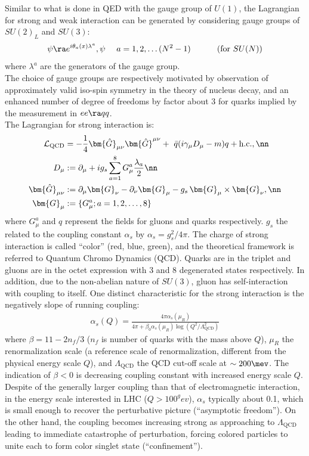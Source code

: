 Similar to what is done in QED with the gauge group of $U(1)$, the Lagrangian for strong and weak interaction can be generated by considering gauge groups of $SU(2)_L$ and $SU(3)$:
$$
\psi \ra e^{i \theta_a(x) \lambda^a}, \psi \,\,\,\,\,\,\,\, a=1,2,\dots (N^2-1) \,\,\,\,\,\, \mbox{\phantom{MM}  (for $SU(N)$)} 
$$
where $\lambda^a$ are the generators of the gauge group. \\
The choice of gauge groups are respectively motivated by observation of approximately valid iso-spin symmetry in the theory of nucleus decay, and an enhanced number of degree of freedoms by factor about 3 for quarks implied by the measurement in $ee\ra qq$. \\

The Lagrangian for strong interaction is:
\begin{align}
\mathcal{L}_{\mathrm{QCD}} & = -\frac{1}{4} \bm{\hat{G}}_{\mu\nu} \bm{\hat{G}}^{\mu\nu} + \,\, \bar{q}(i \gamma_\mu D_\mu - m) q + \mathrm{h.c.}, \nn \\
D_\mu & := \partial_\mu + ig_s \sum_{a=1}^8 G^a_{\mu}\frac{\lambda_a}{2} \nn \\
\bm{\hat{G}}_{\mu\nu} & := \partial_\mu \bm{G}_\nu - \partial_\nu \bm{G}_\mu - g_s \, \bm{G}_\mu \times \bm{G}_\nu, \nn \\
\bm{G}_\mu & := \{G^a_\mu; a=1,2,\dots,8\}
\label{eq::QCDLag}
\end{align}
where $G^a_\mu$ and $q$ represent the fields for gluons and quarks respectively.
$g_s$ the related to the coupling constant $\alpha_s$ by $\alpha_s = g_s^2/4\pi$. 
The charge of strong interaction is called ``color'' (red, blue, green), and the theoretical framework is referred to Quantum Chromo Dynamics (QCD). 
Quarks are in the triplet and gluons are in the octet expression with 3 and 8 degenerated states respectively.
In addition, due to the non-abelian nature of $SU(3)$, gluon has self-interaction with coupling to itself. 
One distinct characteristic for the strong interaction is the negatively slope of running coupling:
\begin{align}
\alpha_s(Q) = \frac{4\pi\alpha_s(\mu_R)}{4\pi + \beta_0 \alpha_s(\mu_R)\log{(Q^2/\Lambda^2_{\mathrm{QCD}})} }
\end{align}
where $\beta = 11 -2n_f/3$ ($n_f$ is number of quarks with the mass above $Q$), $\mu_R$ the renormalization scale (a reference scale of renormalization, different from the physical energy scale $Q$), and $\Lambda_{\mathrm{QCD}}$ the QCD cut-off scale at $\sim 200\mev$. The indication of $\beta<0$ is decreasing coupling constant with increased energy scale $Q$.
Despite of the generally larger coupling than that of electromagnetic interaction, in the energy scale interested in LHC ($Q>100^gev$), $\alpha_s$ typically about 0.1, which is small enough to recover the perturbative picture (``asymptotic freedom''). 
On the other hand, the coupling becomes increasing strong as approaching to $\Lambda_{\mathrm{QCD}}$ leading to immediate catastrophe of perturbation, forcing colored particles to unite each to form color singlet state (``confinement''). \\


